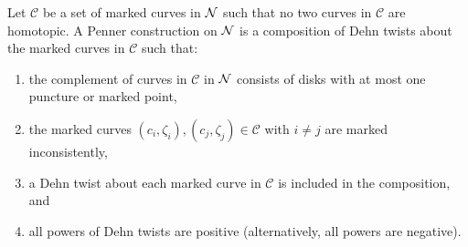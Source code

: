  Let $\mathcal{C}$ be a set of marked curves in $\mathcal{N}$ such that no two curves in $\mathcal{C}$ are homotopic.  A Penner construction on $\mathcal{N}$ is a composition of Dehn twists about the marked curves in $\mathcal{C}$ such that:
\begin{enumerate}
\item the complement of curves in $\mathcal{C}$ in $\mathcal{N}$ consists of disks with at most one puncture or marked point,
    \item the marked curves $(c_i,\zeta_i),(c_j,\zeta_j)\in\mathcal{C}$ with $i\neq j$ are marked inconsistently,
    \item a Dehn twist about each marked curve in $\mathcal{C}$ is included in the composition, and
    \item all powers of Dehn twists are positive (alternatively, all powers are negative).
\end{enumerate}




